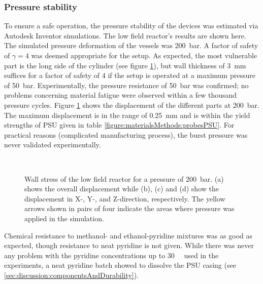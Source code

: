         \subsubsection{Pressure stability}
        To ensure a safe operation, the pressure stability of the devices was estimated via Autodesk Inventor simulations. The low field reactor's results are shown here.
        The simulated pressure deformation of the vessels was \SI{200}{\bar}. A factor of safety of $\gamma = 4$ was deemed appropriate for the setup. As expected, the most vulnerable part is the long side of the cylinder (see figure \ref{fig:results:bubblingReactorPressure}), but wall thickness of \SI{3}{\milli\meter} suffices for a factor of safety of 4 if the setup is operated at a maximum pressure of \SI{50}{\bar}. Experimentally, the pressure resistance of \SI{50}{\bar} was confirmed; no problems concerning material fatigue were observed within a few thousand pressure cycles. Figure \ref{fig:results:bubblingReactorPressure} shows the displacement of the different parts at \SI{200}{\bar}. The maximum displacement is in the range of \SI{0.25}{\milli\meter} and is within the yield strengths of PSU given in table \ref{figure:materialsMethods:probesPSU}. For practical reasons (complicated manufacturing process), the burst pressure was never  validated experimentally.
            \begin{figure}
                \centering
                \hfill
                \\
                \hfill
                \caption[Reactor wall stress simulations]{Wall stress of the low field reactor for a pressure of \SI{200}{\bar}. (a) shows the overall displacement while (b), (c) and (d) show the displacement in X-, Y-, and Z-direction, respectively. The yellow arrows shown in pairs of four indicate the areas where pressure was applied in the simulation.}
                \label{fig:results:bubblingReactorPressure}
            \end{figure}
            Chemical resistance to methanol- and ethanol-pyridine mixtures was as good as expected, though resistance to neat pyridine is not given. While there was never any problem with the pyridine concentrations  up to \SI{30}{\micro\Molar} used in the experiments, a neat pyridine batch showed to dissolve the PSU casing (see \ref{sec:discussion:componentsAndDurability}).
